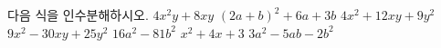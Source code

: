 다음 식을 인수분해하시오.
 $4x^2y+8xy$
 $(2a+b)^2+6a+3b$
 $4x^2+12xy+9y^2$
 $9x^2-30xy+25y^2$
 $16a^2-81b^2$
 $x^2+4x+3$
 $3a^2-5ab-2b^2$
